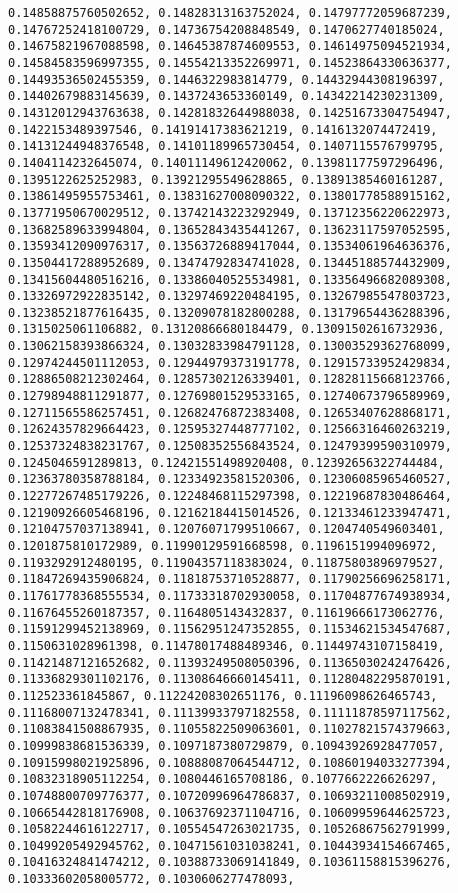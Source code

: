 \documentclass[11pt]{article}
\begin{document}
\begin{Verbatim}[commandchars=\\\{\}]
0.14858875760502652, 0.14828313163752024, 0.14797772059687239, 0.14767252418100729, 0.14736754208848549, 0.1470627740185024, 0.14675821967088598, 0.14645387874609553, 0.14614975094521934, 0.14584583596997355, 0.14554213352269971, 0.14523864330636377, 0.14493536502455359, 0.1446322983814779, 0.14432944308196397, 0.14402679883145639, 0.1437243653360149, 0.14342214230231309, 0.14312012943763638, 0.14281832644988038, 0.14251673304754947, 0.1422153489397546, 0.14191417383621219, 0.1416132074472419, 0.14131244948376548, 0.14101189965730454, 0.1407115576799795, 0.1404114232645074, 0.14011149612420062, 0.13981177597296496, 0.1395122625252983, 0.13921295549628865, 0.13891385460161287, 0.13861495955753461, 0.13831627008090322, 0.13801778588915162, 0.13771950670029512, 0.13742143223292949, 0.13712356220622973, 0.13682589633994804, 0.13652843435441267, 0.13623117597052595, 0.13593412090976317, 0.13563726889417044, 0.13534061964636376, 0.13504417288952689, 0.13474792834741028, 0.13445188574432909, 0.13415604480516216, 0.13386040525534981, 0.13356496682089308, 0.13326972922835142, 0.13297469220484195, 0.13267985547803723, 0.13238521877616435, 0.13209078182800288, 0.13179654436288396, 0.1315025061106882, 0.13120866680184479, 0.13091502616732936, 0.13062158393866324, 0.13032833984791128, 0.13003529362768099, 0.12974244501112053, 0.12944979373191778, 0.12915733952429834, 0.12886508212302464, 0.12857302126339401, 0.12828115668123766, 0.12798948811291877, 0.12769801529533165, 0.12740673796589969, 0.12711565586257451, 0.12682476872383408, 0.12653407628868171, 0.12624357829664423, 0.12595327448777102, 0.12566316460263219, 0.12537324838231767, 0.12508352556843524, 0.12479399590310979, 0.1245046591289813, 0.12421551498920408, 0.12392656322744484, 0.12363780358788184, 0.12334923581520306, 0.12306085965460527, 0.12277267485179226, 0.12248468115297398, 0.12219687830486464, 0.12190926605468196, 0.12162184415014526, 0.12133461233947471, 0.12104757037138941, 0.12076071799510667, 0.1204740549603401, 0.1201875810172989, 0.11990129591668598, 0.1196151994096972, 0.1193292912480195, 0.11904357118383024, 0.11875803896979527, 0.11847269435906824, 0.11818753710528877, 0.11790256696258171, 0.11761778368555534, 0.11733318702930058, 0.11704877674938934, 0.11676455260187357, 0.1164805143432837, 0.11619666173062776, 0.11591299452138969, 0.11562951247352855, 0.11534621534547687, 0.1150631028961398, 0.11478017488489346, 0.11449743107158419, 0.11421487121652682, 0.11393249508050396, 0.11365030242476426, 0.11336829301102176, 0.11308646660145411, 0.11280482295870191, 0.112523361845867, 0.11224208302651176, 0.11196098626465743, 0.11168007132478341, 0.11139933797182558, 0.11111878597117562, 0.11083841508867935, 0.11055822509063601, 0.11027821574379663, 0.10999838681536339, 0.1097187380729879, 0.10943926928477057, 0.10915998021925896, 0.10888087064544712, 0.10860194033277394, 0.10832318905112254, 0.1080446165708186, 0.1077662226626297, 0.10748800709776377, 0.10720996964786837, 0.10693211008502919, 0.10665442818176908, 0.10637692371104716, 0.10609959644625723, 0.10582244616122717, 0.10554547263021735, 0.10526867562791999, 0.10499205492945762, 0.10471561031038241, 0.10443934154667465, 0.10416324841474212, 0.10388733069141849, 0.10361158815396276, 0.10333602058005772, 0.1030606277478093, 
\end{Verbatim}
\end{document}
